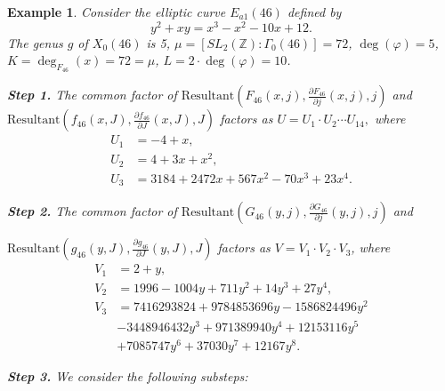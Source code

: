 \documentclass[10pt, a4paper]{article}
\newtheorem{example}[theorem]{Example}
\begin{document}
\begin{example}
Consider the elliptic curve $E_{a1}(46)$ defined by
\[ y^2 + xy = x^3 - x^2 - 10x + 12. \]
The genus $g$ of $X_{0}(46)$  is 5,
$\mu = [SL_2(\mathbb{Z}):\Gamma_0(46)] = 72$,
 $\deg(\varphi) = 5$,
$K = \deg_{F_{46}}(x) = 72 = \mu$, $L = 2 \cdot \deg(\varphi) = 10$.

{\bf  Step 1.}  The common factor of
$ \text{Resultant}\left(F_{46}(x,j), \frac{\partial F_{46}}{\partial j}(x,j), j\right) $
and \\
$
\text{Resultant}(f_{46}(x,J), \frac{\partial f_{46}}{\partial J}(x,J), J)
$  factors  as
$U = U_1 \cdot U_2 \cdots U_{14},$
where
\begin{align*}
U_1 &= -4 + x, \\
U_2 &= 4 + 3x + x^2, \\
U_3 &= 3184 + 2472x + 567x^2 - 70x^3 + 23x^4.
\end{align*}

{\bf  Step 2.}
The common factor of
$\text{Resultant}(G_{46}(y,j), \frac{\partial G_{46}}{\partial j}(y,j), j)$ and

$\text{Resultant}(g_{46}(y,J), \frac{\partial g_{46}}{\partial J}(y,J), J)$
factors as
$V = V_1 \cdot V_2 \cdot V_3$,  where
\begin{align*}
V_1 &= 2 + y, \\
V_2 &= 1996 - 1004y + 711y^2 + 14y^3 + 27y^4, \\
V_3 &=
7416293824 + 9784853696y - 1586824496y^2 \\
&- 3448946432y^3 + 971389940y^4 + 12153116y^5\\
&+ 7085747y^6 + 37030y^7 + 12167y^8.
\end{align*}

{\bf  Step 3.} We consider the following substeps:


\end{example}
\end{document}
